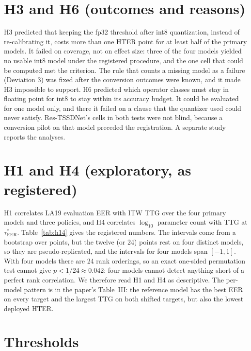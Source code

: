 \documentclass[10pt]{article}
\newcommand{\tauE}{\tau^{*}_{\mathrm{EER}}}
\begin{document}
\section{H3 and H6 (outcomes and reasons)}
\label{sec:h3h6}
H3 predicted that keeping the fp32 threshold after int8 quantization, instead of re-calibrating it, costs more than one HTER point for at
least half of the primary models. It failed on coverage, not on effect size: three of the four models yielded no usable int8 model under
the registered procedure, and the one cell that could be computed met the criterion. The rule that counts a missing model as a failure
(Deviation 3) was fixed after the conversion outcomes were known, and it made H3 impossible to support. H6 predicted which operator
classes must stay in floating point for int8 to stay within its accuracy budget. It could be evaluated for one model only, and there it
failed on a clause that the quantizer used could never satisfy. Res-TSSDNet's cells in both tests were not blind, because a conversion
pilot on that model preceded the registration. A separate study reports the analyses.

\section{H1 and H4 (exploratory, as registered)}
H1 correlates LA19 evaluation EER with ITW TTG over the four primary models and three policies, and H4 correlates \(\log_{10}\) parameter
count with TTG at \(\tauE\). Table~\ref{tab:h14} gives the registered numbers. The intervals come from a bootstrap over points, but the
twelve (or 24) points rest on four distinct models, so they are pseudo-replicated, and the intervals for four models span \([-1,1]\). With
four models there are 24 rank orderings, so an exact one-sided permutation test cannot give \(p<1/24\approx0.042\): four models cannot
detect anything short of a perfect rank correlation. We therefore read H1 and H4 as descriptive. The per-model pattern is in the paper's
Table~III: the reference model has the best EER on every target and the largest TTG on both shifted targets, but also the lowest deployed
HTER.

\begin{table}[!ht]
\caption{H1 and H4 as registered (Spearman \(\rho\), bootstrap over points, \(B=1000\)).}
\label{tab:h14}
\centering
\footnotesize

\end{table}

\section{Thresholds}
\end{document}
